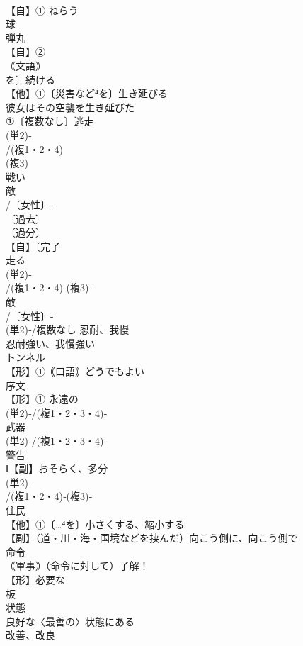 \documentclass[8pt]{extreport}
\begin{document}
\begin{CJK}{UTF8}{min}
\\	【自】① ねらう 
\\	球
\\	弾丸
\\	【自】②
\\	｟文語｠
\\	を〕続ける
\\	【他】①〔災害など⁴を〕生き延びる
\\	彼女はその空襲を生き延びた
\\	①〔複数なし〕逃走
\\	(単2)‐
\\	/(複1・2・4)
\\	(複3)
\\	戦い 
\\	敵
\\	/〔女性〕-
\\	〔過去〕
\\	〔過分〕
\\	【自】〔完了
\\	走る 
\\	(単2)‐
\\	/(複1・2・4)‐(複3)‐
\\	敵
\\	/〔女性〕-
\\	(単2)‐/複数なし 忍耐、我慢
\\	忍耐強い、我慢強い
\\	トンネル
\\	【形】①｟口語｠どうでもよい
\\	序文 
\\	【形】① 永遠の 
\\	(単2)‐/(複1・2・3・4)‐
\\	武器 
\\	(単2)‐/(複1・2・3・4)‐
\\	警告
\\	Ⅰ【副】おそらく、多分
\\	(単2)‐
\\	/(複1・2・4)‐(複3)‐
\\	住民
\\	【他】①〔…⁴を〕小さくする、縮小する
\\	【副】（道・川・海・国境などを挟んだ）向こう側に、向こう側で 
\\	命令
\\	｟軍事｠（命令に対して）了解！
\\	【形】必要な
\\	板
\\	状態
\\	良好な〈最善の〉状態にある
\\	改善、改良

\end{CJK}
\end{document}
